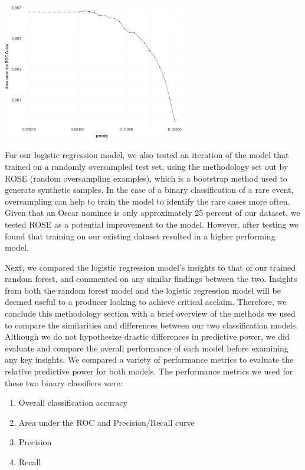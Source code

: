 \documentclass[10pt]{article}
\begin{document}
\begin{center}
\includegraphics[width=8cm]{_assets/log-reg-plots/log_reg__tuning-plot-roc-curve-1.png}
\end{center}

For our logistic regression model, we also tested an iteration of the model that trained on a randomly oversampled test set, using the methodology set out by ROSE (random oversampling examples), which is a bootstrap method used to generate synthetic samples. In the case of a binary classification of a rare event, oversampling can help to train the model to identify the rare cases more often. Given that an Oscar nominee is only approximately 25 percent of our dataset, we tested ROSE as a potential improvement to the model. However, after testing we found that training on our existing dataset resulted in a higher performing model.

Next, we compared the logistic regression model’s insights to that of our trained random forest, and commented on any similar findings between the two. Insights from both the random forest model and the logistic regression model will be deemed useful to a producer looking to achieve critical acclaim. Therefore, we conclude this methodology section with a brief overview of the methods we used to compare the similarities and differences between our two classification models. Although we do not hypothesize drastic differences in predictive power, we did evaluate and compare the overall performance of each model before examining any key insights. We compared a variety of performance metrics to evaluate the relative predictive power for both models. The performance metrics we used for these two binary classifiers were:

\begin{enumerate}
\item Overall classification accuracy
\item Area under the ROC and Precision/Recall curve 
\item Precision
\item Recall 
\end{enumerate}
\end{document}
